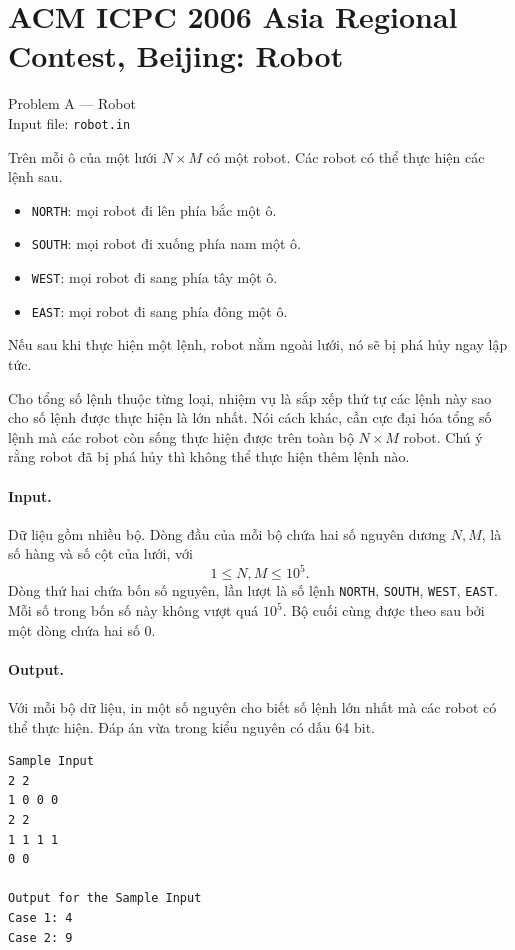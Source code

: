 \documentclass[11pt]{article}
\begin{document}
\section{ACM ICPC 2006 Asia Regional Contest, Beijing: Robot}

\begin{center}
Problem A --- Robot\\
Input file: \texttt{robot.in}
\end{center}

Trên mỗi ô của một lưới \(N\times M\) có một robot. Các robot có thể thực hiện
các lệnh sau.
\begin{itemize}
  \item \texttt{NORTH}: mọi robot đi lên phía bắc một ô.
  \item \texttt{SOUTH}: mọi robot đi xuống phía nam một ô.
  \item \texttt{WEST}: mọi robot đi sang phía tây một ô.
  \item \texttt{EAST}: mọi robot đi sang phía đông một ô.
\end{itemize}
Nếu sau khi thực hiện một lệnh, robot nằm ngoài lưới, nó sẽ bị phá hủy ngay lập
tức.

Cho tổng số lệnh thuộc từng loại, nhiệm vụ là sắp xếp thứ tự các lệnh này sao
cho số lệnh được thực hiện là lớn nhất. Nói cách khác, cần cực đại hóa tổng số
lệnh mà các robot còn sống thực hiện được trên toàn bộ \(N\times M\) robot.
Chú ý rằng robot đã bị phá hủy thì không thể thực hiện thêm lệnh nào.

\paragraph{Input.}
Dữ liệu gồm nhiều bộ. Dòng đầu của mỗi bộ chứa hai số nguyên dương \(N,M\), là
số hàng và số cột của lưới, với
\[
  1\le N,M\le 10^5.
\]
Dòng thứ hai chứa bốn số nguyên, lần lượt là số lệnh \texttt{NORTH},
\texttt{SOUTH}, \texttt{WEST}, \texttt{EAST}. Mỗi số trong bốn số này không
vượt quá \(10^5\). Bộ cuối cùng được theo sau bởi một dòng chứa hai số 0.

\paragraph{Output.}
Với mỗi bộ dữ liệu, in một số nguyên cho biết số lệnh lớn nhất mà các robot có
thể thực hiện. Đáp án vừa trong kiểu nguyên có dấu 64 bit.

\begin{verbatim}
Sample Input
2 2
1 0 0 0
2 2
1 1 1 1
0 0

Output for the Sample Input
Case 1: 4
Case 2: 9
\end{verbatim}
\end{document}
